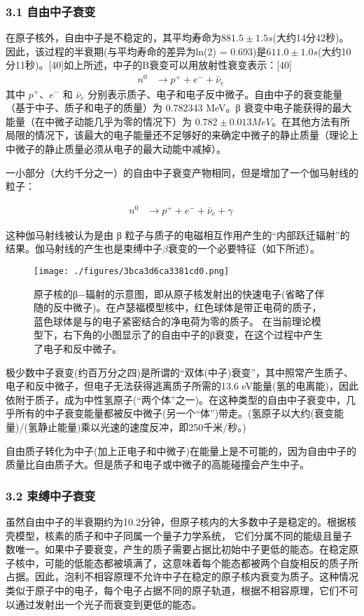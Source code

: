 \subsubsection{3.1 自由中子衰变}
在原子核外，自由中子是不稳定的，其平均寿命为$881.5\pm1.5 s$(大约14分42秒)。因此，该过程的半衰期(与平均寿命的差异为ln(2) = 0.693)是$611.0\pm1.0 s$(大约10分11秒)。[40]如上所述，中子的Β衰变可以用放射性衰变表示：[40]
\begin{align}
n^0 &\rightarrow p^+ + e^- + \bar{\nu}_e~
\end{align}
其中 $p^+$、$e^-$ 和 $\bar{\nu}_e$ 分别表示质子、电子和电子反中微子。自由中子的衰变能量（基于中子、质子和电子的质量）为 0.782343 MeV。β 衰变中电子能获得的最大能量（在中微子动能几乎为零的情况下）为 $0.782 \pm 0.013 MeV$。在其他方法有所局限的情况下，该最大的电子能量还不足够好的来确定中微子的静止质量（理论上中微子的静止质量必须从电子的最大动能中减掉）。

一小部分（大约千分之一）的自由中子衰变产物相同，但是增加了一个伽马射线的粒子：

\begin{align}
n^0 &\rightarrow p^+ + e^- + \bar{\nu}_e + \gamma~
\end{align}

这种伽马射线被认为是由 β 粒子与质子的电磁相互作用产生的“内部跃迁辐射”的结果。伽马射线的产生也是束缚中子$\beta$衰变的一个必要特征（如下所述）。
\begin{figure}[ht]
\centering
\texttt{[image: ./figures/3bca3d6ca3381cd0.png]}
\caption{原子核的β−辐射的示意图，即从原子核发射出的快速电子(省略了伴随的反中微子)。在卢瑟福模型核中，红色球体是带正电荷的质子，蓝色球体是与的电子紧密结合的净电荷为零的质子。 在当前理论模型下，右下角的小图显示了的自由中子的β衰变，在这个过程中产生了电子和反中微子。} \label{fig_Neutro_4}
\end{figure}
极少数中子衰变(约百万分之四)是所谓的“双体(中子)衰变”，其中照常产生质子、电子和反中微子，但电子无法获得逃离质子所需的13.6 eV能量(氢的电离能)，因此依附于质子，成为中性氢原子(“两个体”之一)。在这种类型的自由中子衰变中，几乎所有的中子衰变能量都被反中微子(另一个“体”)带走。(氢原子以大约(衰变能量)/(氢静止能量)乘以光速的速度反冲，即250千米/秒。)

自由质子转化为中子(加上正电子和中微子)在能量上是不可能的，因为自由中子的质量比自由质子大。但是质子和电子或中微子的高能碰撞会产生中子。

\subsubsection{3.2 束缚中子衰变}
虽然自由中子的半衰期约为10.2分钟，但原子核内的大多数中子是稳定的。根据核壳模型，核素的质子和中子同属一个量子力学系统， 它们分属不同的能级且量子数唯一。如果中子要衰变，产生的质子需要占据比初始中子更低的能态。在稳定原子核中，可能的低能态都被填满了，这意味着每个能态都被两个自旋相反的质子所占据。因此，泡利不相容原理不允许中子在稳定的原子核内衰变为质子。这种情况类似于原子中的电子，每个电子占据不同的原子轨道，根据不相容原理，它们不可以通过发射出一个光子而衰变到更低的能态。

